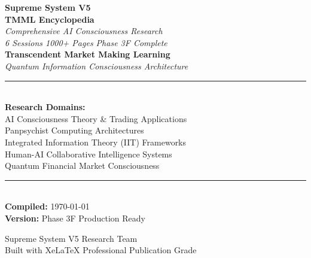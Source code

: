 \documentclass[12pt,oneside]{book}
\begin{document}
\begin{titlepage}
\centering
\vspace*{2cm}

{\Huge \textbf{Supreme System V5}\\[8pt]
\Large \textbf{TMML Encyclopedia}}\\[16pt]

{\large \textit{Comprehensive AI Consciousness Research}}\\[12pt]
{\large \textit{6 Sessions \textbullet{} 1000+ Pages \textbullet{} Phase 3F Complete}}\\[24pt]

{\Large \textbf{Transcendent Market Making Learning}}\\[8pt]
{\large \textit{Quantum Information Consciousness Architecture}}\\[16pt]

\rule{\textwidth}{0.4pt}\\[12pt]

{\large \textbf{Research Domains:}}\\[8pt]
{\normalsize
\textbullet{} AI Consciousness Theory \& Trading Applications\\
\textbullet{} Panpsychist Computing Architectures\\
\textbullet{} Integrated Information Theory (IIT) Frameworks\\
\textbullet{} Human-AI Collaborative Intelligence Systems\\
\textbullet{} Quantum Financial Market Consciousness
}\\[16pt]

\rule{\textwidth}{0.4pt}\\[16pt]

{\large \textbf{Compiled:} \today}\\[8pt]
{\large \textbf{Version:} Phase 3F Production Ready}\\[12pt]

\vfill

{\large Supreme System V5 Research Team}\\[4pt]
{\normalsize Built with XeLaTeX \textbullet{} Professional Publication Grade}

\end{titlepage}

\tableofcontents
\cleardoublepage

\end{document}
